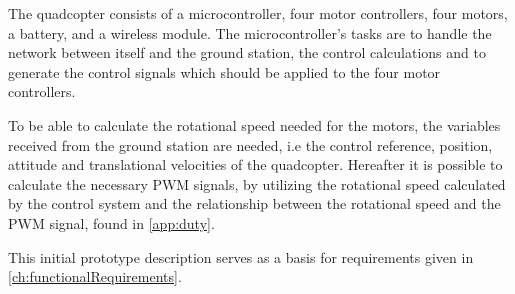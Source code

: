 The quadcopter consists of a microcontroller, four motor controllers, four motors, a battery, and a wireless module. The microcontroller's tasks are to handle the network between itself and the ground station, the control calculations and to generate the control signals which should be applied to the four motor controllers.

To be able to calculate the rotational speed needed for the motors, the variables received from the ground station are needed, i.e the control reference, position, attitude and translational velocities of the quadcopter. Hereafter it is possible to calculate the necessary PWM signals, by utilizing the rotational speed calculated by the control system and the relationship between the rotational speed and the PWM signal, found in \autoref{app:duty}.










This initial prototype description serves as a basis for requirements given in \autoref{ch:functionalRequirements}.

